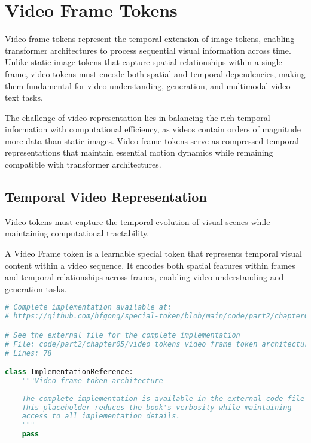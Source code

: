 
\section{Video Frame Tokens}

Video frame tokens represent the temporal extension of image tokens, enabling transformer architectures to process sequential visual information across time. Unlike static image tokens that capture spatial relationships within a single frame, video tokens must encode both spatial and temporal dependencies, making them fundamental for video understanding, generation, and multimodal video-text tasks.

The challenge of video representation lies in balancing the rich temporal information with computational efficiency, as videos contain orders of magnitude more data than static images. Video frame tokens serve as compressed temporal representations that maintain essential motion dynamics while remaining compatible with transformer architectures.

\subsection{Temporal Video Representation}

Video tokens must capture the temporal evolution of visual scenes while maintaining computational tractability.

\begin{definition}
A Video Frame token is a learnable special token that represents temporal visual content within a video sequence. It encodes both spatial features within frames and temporal relationships across frames, enabling video understanding and generation tasks.
\end{definition}

\begin{lstlisting}[language=Python, caption={Video frame token architecture}]
# Complete implementation available at:
# https://github.com/hfgong/special-token/blob/main/code/part2/chapter05/video_tokens_video_frame_token_architecture.py

# See the external file for the complete implementation
# File: code/part2/chapter05/video_tokens_video_frame_token_architecture.py
# Lines: 78

class ImplementationReference:
    """Video frame token architecture
    
    The complete implementation is available in the external code file.
    This placeholder reduces the book's verbosity while maintaining
    access to all implementation details.
    """
    pass
\end{lstlisting}

